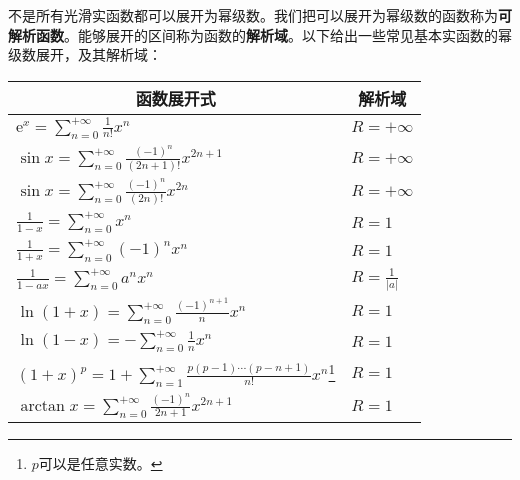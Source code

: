 \documentclass[12pt,UTF8]{ctexbook}
\theoremstyle{definition}
\theoremstyle{plain}
\begin{document}
不是所有光滑实函数都可以展开为幂级数。我们把可以展开为幂级数的函数称为\textbf{可解析函数}。能够展开的区间称为函数的\textbf{解析域}。以下给出一些常见基本实函数的幂级数展开，及其解析域：

\begin{center}
    \renewcommand{\arraystretch}{2}
    \setlength{\extrarowheight}{-3pt}
    \begin{longtable}{|l|l|}
        \hline \multicolumn{1}{|c|}{\textbf{函数展开式}} & \multicolumn{1}{c|}{\textbf{解析域}} \\ 
        \hline         
        $\mathrm{e}^x = \displaystyle  \sum_{n=0}^{+\infty} \frac{1}{n!} x^n $ & $R=+\infty$ \\  
        \hline
        $\sin{x} = \displaystyle  \sum_{n=0}^{+\infty} \frac{(-1)^n}{(2n+1)!} x^{2n+1} $ & $R=+\infty$ \\ 
        \hline
        $\sin{x} = \displaystyle  \sum_{n=0}^{+\infty} \frac{(-1)^n}{(2n)!} x^{2n} $ & $R=+\infty$ \\
        \hline
        $\displaystyle \frac{1}{1 - x} = \sum_{n=0}^{+\infty} x^n $ & $R = 1$ \\
        \hline
        $\displaystyle \frac{1}{1 + x} = \displaystyle  \sum_{n=0}^{+\infty} (-1)^n x^n $ & $R = 1$ \\
        \hline
        $\displaystyle \frac{1}{1 - ax} = \displaystyle  \sum_{n=0}^{+\infty} a^n x^n $ & $R = \frac{1}{|a|}$ \\
        \hline
        $\ln{(1 + x)} = \displaystyle  \sum_{n=0}^{+\infty} \frac{(-1)^{n+1}}{n} x^n $ & $R = 1$ \\
        \hline
        $\ln{(1 - x)} = \displaystyle  -\sum_{n=0}^{+\infty} \frac{1}{n} x^n $ & $R = 1$ \\
        \hline
        $(1 + x)^p = \displaystyle 1 + \sum_{n=1}^{+\infty} \frac{p(p - 1)\cdots(p - n + 1)}{n!} x^n $\footnote{$p$可以是任意实数。} & $R = 1$ \\
        \hline
        $\arctan{x} = \displaystyle  \sum_{n=0}^{+\infty} \frac{(-1)^n}{2n + 1} x^{2n+1} $ & $R=1$ \\
        \hline
    \end{longtable}
\end{center}
\end{document}
